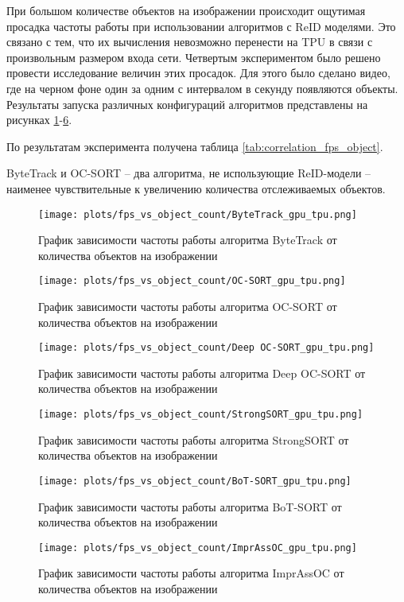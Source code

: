 При большом количестве объектов на изображении происходит ощутимая просадка частоты работы при использовании алгоритмов с ReID моделями. 
Это связано с тем, что их вычисления невозможно перенести на TPU в связи с произвольным размером входа сети.  
Четвертым экспериментом было решено провести исследование величин этих просадок. Для этого было сделано видео, где на черном фоне один за одним с интервалом в секунду появляются объекты. 
Результаты запуска различных конфигураций алгоритмов представлены на рисунках \ref{fig:fps_object_ByteTrack}-\ref{fig:fps_object_ImprAssOC}.

По результатам эксперимента получена таблица \ref{tab:correlation_fps_object}. 

ByteTrack и OC-SORT -- два алгоритма, не использующие ReID-модели -- наименее чувствительные к увеличению количества отслеживаемых объектов.
\begin{figure}[ht]
    \centering
    \texttt{[image: plots/fps\_vs\_object\_count/ByteTrack\_gpu\_tpu.png]}
    \caption{График зависимости частоты работы алгоритма ByteTrack от количества объектов на изображении}
    \label{fig:fps_object_ByteTrack}
\end{figure}

\begin{figure}[ht]
    \centering
    \texttt{[image: plots/fps\_vs\_object\_count/OC-SORT\_gpu\_tpu.png]}
    \caption{График зависимости частоты работы алгоритма OC-SORT от количества объектов на изображении}
    \label{fig:fps_object_OC-SORT}
\end{figure}

\begin{figure}[ht]
    \centering
    \texttt{[image: plots/fps\_vs\_object\_count/Deep OC-SORT\_gpu\_tpu.png]}
    \caption{График зависимости частоты работы алгоритма Deep OC-SORT от количества объектов на изображении}
    \label{fig:fps_object_Deep OC-SORT}
\end{figure}

\begin{figure}[ht]
    \centering
    \texttt{[image: plots/fps\_vs\_object\_count/StrongSORT\_gpu\_tpu.png]}
    \caption{График зависимости частоты работы алгоритма StrongSORT от количества объектов на изображении}
    \label{fig:fps_object_StrongSORT}
\end{figure}

\begin{figure}[ht]
    \centering
    \texttt{[image: plots/fps\_vs\_object\_count/BoT-SORT\_gpu\_tpu.png]}
    \caption{График зависимости частоты работы алгоритма BoT-SORT от количества объектов на изображении}
    \label{fig:fps_object_BoT-SORT}
\end{figure}

\begin{figure}[ht]
    \centering
    \texttt{[image: plots/fps\_vs\_object\_count/ImprAssOC\_gpu\_tpu.png]}
    \caption{График зависимости частоты работы алгоритма ImprAssOC от количества объектов на изображении}
    \label{fig:fps_object_ImprAssOC}
\end{figure}
\FloatBarrier